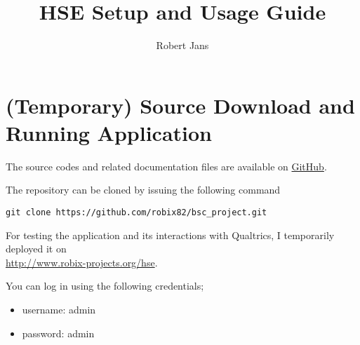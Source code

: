 \documentclass[fleqn]{article}
\title{HSE Setup and Usage Guide}
\author{Robert Jans}
\begin{document}
\setlength{\parindent}{0cm}

\maketitle

\newpage

\tableofcontents

\newpage


\section{(Temporary) Source Download and Running Application}

The source codes and related documentation files are available on \href{https://github.com/robix82/bsc_project/}{GitHub}.

The repository can be cloned by issuing the following command 
\begin{verbatim}
git clone https://github.com/robix82/bsc_project.git
\end{verbatim}

For testing the application and its interactions with Qualtrics, I temporarily deployed it on \\
\url{http://www.robix-projects.org/hse}.

You can log in using the following credentials;

\begin{itemize}
\item username: admin
\item password: admin
\end{itemize}
\end{document}
